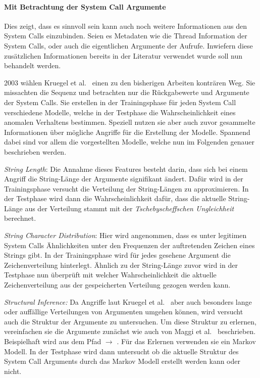     \paragraph{Mit Betrachtung der System Call Argumente}\label{sec:related_sys_arg}
        Dies zeigt, dass es sinnvoll sein kann auch noch weitere Informationen aus den System Calls einzubinden.
        Seien es Metadaten wie die Thread Information der System Calls, oder auch die eigentlichen Argumente der Aufrufe.
        Inwiefern diese zusätzlichen Informationen bereits in der Literatur verwendet wurde soll nun behandelt werden.

        2003 wählen Kruegel et al.~\cite{ARGUMENTS} einen zu den bisherigen Arbeiten konträren Weg.
        Sie missachten die Sequenz und betrachten nur die Rückgabewerte und Argumente der System Calls.
        Sie erstellen in der Trainingsphase für jeden System Call verschiedene Modelle, welche in der Testphase die Wahrscheinlichkeit eines anomalen Verhaltens bestimmen.
        Speziell nutzen sie aber auch zuvor gesammelte Informationen über mögliche Angriffe für die Erstellung der Modelle.
        Spannend dabei sind vor allem die vorgestellten Modelle, welche nun im Folgenden genauer beschrieben werden.

        \textit{String Length}: Die Annahme dieses Features besteht darin, dass sich bei einem Angriff die String-Länge der Argumente signifikant ändert.
        Dafür wird in der Trainingsphase versucht die Verteilung der String-Längen zu approximieren.
        In der Testphase wird dann die Wahrscheinlichkeit dafür, dass die aktuelle String-Länge aus der Verteilung stammt mit der \textit{Tschebyscheffschen Ungleichheit} berechnet.
        
        \textit{String Character Distribution}: Hier wird angenommen, dass es unter legitimen System Calls Ähnlichkeiten unter den Frequenzen der auftretenden Zeichen eines Strings gibt.
        In der Trainingsphase wird für jedes gesehene Argument die Zeichenverteilung hinterlegt.
        Ähnlich zu der String-Länge zuvor wird in der Testphase nun überprüft mit welcher Wahrscheinlichkeit die aktuelle Zeichenverteilung aus der gespeicherten Verteilung gezogen werden kann.

        \textit{Structural Inference:} Da Angriffe laut Kruegel et al.~\cite{ARGUMENTS} aber auch besonders lange oder auffällige Verteilungen von Argumenten umgehen können, wird versucht auch die Struktur der Argumente zu untersuchen.
        Um diese Struktur zu erlernen, vereinfachen sie die Argumente zunächst wie auch von Maggi et al.~\cite{ARGUMENTS2} beschrieben.
        Beispielhaft wird aus dem Pfad  $\longrightarrow$ .
        Für das Erlernen verwenden sie ein Markov Modell.
        In der Testphase wird dann untersucht ob die aktuelle Struktur des System Call Arguments durch das Markov Modell erstellt werden kann oder nicht.

